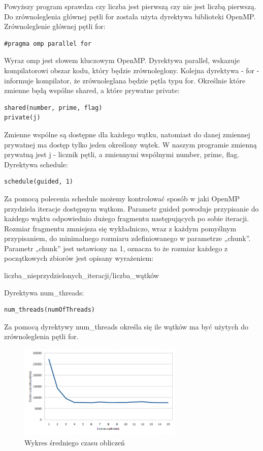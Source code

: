 \documentclass[a4paper,11pt]{article}
\begin{document}
Powyższy program sprawdza czy liczba jest pierwszą czy nie jest liczbą pierwszą. Do zrównoleglenia głównej pętli for została użyta dyrektywa biblioteki OpenMP.
Zrównoleglenie głównej pętli for: 
\begin{lstlisting}
#pragma omp parallel for
\end{lstlisting}
Wyraz omp jest słowem kluczowym OpenMP. Dyrektywa parallel, wskazuje kompilatorowi obszar kodu, który będzie zrównoleglony. Kolejna dyrektywa - for - informuje kompilator, że zrównoleglana będzie pętla typu for.
Określnie które zmienne będą wspólne shared, a które prywatne private:
\begin{lstlisting}
shared(number, prime, flag)
private(j)
\end{lstlisting}
Zmienne wspólne są dostępne dla każdego wątku, natomiast do danej zmiennej prywatnej ma dostęp tylko jeden określony wątek. W naszym programie zmienną prywatną jest j - licznik pętli, a zmiennymi wspólnymi number, prime, flag.
\newline
\newline
Dyrektywa schedule: 
\begin{lstlisting}
schedule(guided, 1)
\end{lstlisting}
Za pomocą polecenia schedule możemy kontrolować sposób w jaki OpenMP przydziela iteracje dostępnym wątkom. Parametr guided powoduje przypisanie do każdego wąktu odpowiednio dużego fragmentu następujących po sobie iteracji. Rozmiar fragmentu zmniejsza się wykładniczo, wraz z każdym pomyślnym przypisaniem, do minimalnego rozmiaru zdefiniowanego w parametrze „chunk”. Parametr „chunk” jest ustawiony na 1, oznacza to że rozmiar każdego z początkowych zbiorów jest opisany wyrażeniem: \begin{center}liczba\_nieprzydzielonych\_iteracji/liczba\_wątków
\end{center}
Dyrektywa num\_threads: 
\begin{lstlisting}
num_threads(numOfThreads)
\end{lstlisting}
Za pomocą dyrektywy num\_threads określa się ile wątków ma być użytych do zrównoleglenia pętli for.



\begin{figure}[!ht]
	\centering
 \includegraphics[width=0.7\textwidth]{1.png}
  \caption{Wykres średniego czasu obliczeń}
\end{figure}
\end{document}
